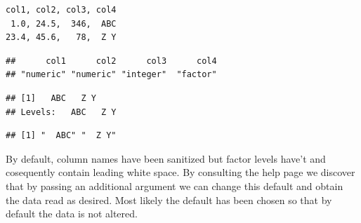 \documentclass[krantz2]{krantz}\usepackage{knitr}%
\begin{document}
\begin{knitrout}\footnotesize
{}\color{fgcolor}\begin{kframe}
\begin{verbatim}
col1, col2, col3, col4
 1.0, 24.5,  346,  ABC
23.4, 45.6,   78,  Z Y
\end{verbatim}
\end{kframe}
\end{knitrout}

\begin{knitrout}\footnotesize
{}\color{fgcolor}\begin{kframe}
\begin{alltt}
 \hlkwb{<-} \hlstd{(}\hlstd{)}
\end{alltt}
\end{kframe}
\end{knitrout}

\begin{knitrout}\footnotesize
{}\color{fgcolor}\begin{kframe}
\begin{alltt}
\end{alltt}
\begin{verbatim}
##      col1      col2      col3      col4 
## "numeric" "numeric" "integer"  "factor"
\end{verbatim}
\begin{alltt}
\hlstd{from_csv_b.df[[}\hlstd{]]}
\end{alltt}
\begin{verbatim}
## [1]   ABC   Z Y
## Levels:   ABC   Z Y
\end{verbatim}
\begin{alltt}
\hlstd{(from_csv_b.df[[}\hlstd{]])}
\end{alltt}
\begin{verbatim}
## [1] "  ABC" "  Z Y"
\end{verbatim}
\end{kframe}
\end{knitrout}

By default, column names have been sanitized but factor levels have't and cosequently contain leading white space. By consulting the help page we discover that by passing an additional argument we can change this default and obtain the data read as desired. Most likely the default has been chosen so that by default the data is not altered.
\end{document}
